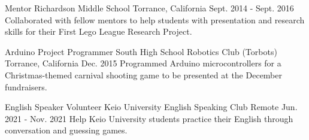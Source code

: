 

\begin{cventries}

  \cventry
    {Mentor} %
    {Richardson Middle School} %
    {Torrance, California} %
    {Sept. 2014 - Sept. 2016} %
    {
      Collaborated with fellow mentors to help students with presentation and research skills for their
      First Lego League Research Project.
    }
    \vspace{0.1in}

    \cventry
    {Arduino Project Programmer} %
    {South High School Robotics Club (Torbots)} %
    {Torrance, California} %
    {Dec. 2015} %
    {
      Programmed Arduino microcontrollers for a Christmas-themed carnival
      shooting game to be presented at the December fundraisers.
    }
    \vspace{0.1in}

    \cventry
    {English Speaker Volunteer} %
    {Keio University English Speaking Club} %
    {Remote} %
    {Jun. 2021 - Nov. 2021} %
    {
      Help Keio University students practice their English through conversation and guessing games.
    }

\end{cventries}
